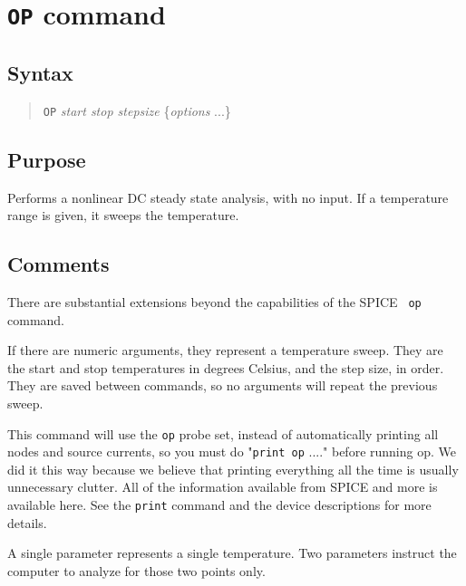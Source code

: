 \section{{\tt OP} command}
\subsection{Syntax}
\begin{verse}
{\tt OP} {\it start stop stepsize} \{{\it options} ...\}
\end{verse}
\subsection{Purpose}

Performs a nonlinear DC steady state analysis, with no input.  If a
temperature range is given, it sweeps the temperature.
\subsection{Comments}

There are substantial extensions beyond the capabilities of the SPICE {\tt
op} command.

If there are numeric arguments, they represent a temperature sweep.  They are
the start and stop temperatures in degrees Celsius, and the step size, in
order.  They are saved between commands, so no arguments will repeat the
previous sweep.

This command will use the {\tt op} probe set, instead of automatically
printing all nodes and source currents, so you must do "{\tt print
op} ...." before running op.  We did it this way because we believe
that printing everything all the time is usually unnecessary clutter.
All of the information available from SPICE and more is available
here.  See the {\tt print} command and the device descriptions for
more details.

A single parameter represents a single temperature.  Two parameters instruct
the computer to analyze for those two points only.

